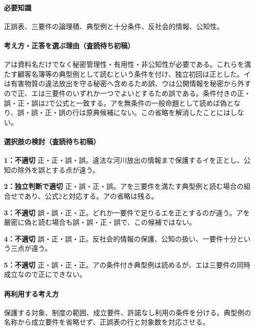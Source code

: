 \paragraph{必要知識} 正誤表、三要件の論理積、典型例と十分条件、反社会的情報、公知性。

\paragraph{考え方・正答を選ぶ理由（査読待ち初稿）} アは資料名だけでなく秘密管理性・有用性・非公知性が必要である。これらを満たす顧客名簿等の典型例として読むという条件を付け、独立初回は正とした。イは有害物質の違法放出を守る秘密へ含めるため誤、ウは公開情報を秘密から外すので正、エは三要件のいずれか一つでよいとするため誤である。条件付きの正・誤・正・誤は2で公式と一致する。アを無条件の一般命題として読めば偽となり、誤・誤・正・誤の行は原典候補にない。この省略を解消したことにはしない。

\paragraph{選択肢の検討（査読待ち初稿）}\mbox{}\par

\noindent\textbf{1：不適切} 正・正・誤・誤。違法な河川放出の情報まで保護するイを正とし、公知の除外を誤とする点が違う。\par

\noindent\textbf{2：独立判断で適切} 正・誤・正・誤。アを三要件を満たす典型例と読む場合の組合せであり、公式2と対応する。アの省略は残る。\par

\noindent\textbf{3：不適切} 誤・誤・正・正。どれか一要件で足りるエを正とするのが違う。アを厳密に偽と読む場合も誤・誤・正・誤で、この候補ではない。\par

\noindent\textbf{4：不適切} 誤・正・誤・正。反社会的情報の保護、公知の扱い、一要件十分という三点が違う。\par

\noindent\textbf{5：不適切} 正・誤・正・正。アの条件付き典型例は読めるが、エは三要件の同時成立なので正にできない。\par

\paragraph{再利用する考え方} 保護する対象、制度の範囲、成立要件、許諾なし利用の条件を分ける。典型例の名称から成立要件を省略せず、正誤表の行と対象数を対応させる。

